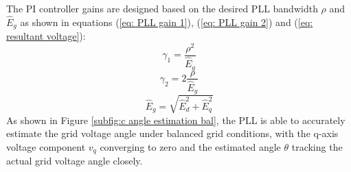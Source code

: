 The PI controller gains are designed based on the desired PLL bandwidth $\rho$ and $\hat{E}_g$ as shown in equations
(\ref{eq: PLL gain 1}), (\ref{eq: PLL gain 2}) and (\ref{eq: resultant voltage}):
\begin{equation}
    \gamma_1 = \frac{\rho^2}{\hat{E}_g}
    \label{eq: PLL gain 1}
\end{equation}
\begin{equation}
    \gamma_2 = 2 \frac{\rho}{\hat{E}_g}
    \label{eq: PLL gain 2}
\end{equation}
\begin{equation}
    \hat{E}_g = \sqrt{\hat{E}_d^2 + \hat{E}_q^2}
    \label{eq: resultant voltage}
\end{equation}
As shown in Figure \ref{subfig:c angle estimation bal}, the PLL is able to accurately estimate the grid voltage angle under balanced grid conditions,
with the q-axis voltage component $v_q$ converging to zero and the estimated angle $\theta$ tracking the actual grid voltage angle closely.\par


